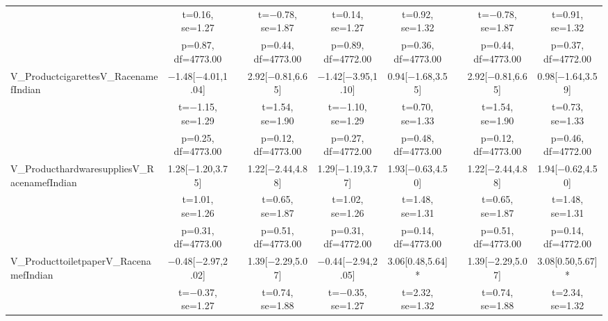 \documentclass[]{report}
\begin{document}
\begin{table}
{\begin{tabular}[t]{lcccccccc}
		& t=\num{0.16}, se=\num{1.27} &  & t=\num{-0.78}, se=\num{1.87} & t=\num{0.14}, se=\num{1.27} & t=\num{0.92}, se=\num{1.32} &  & t=\num{-0.78}, se=\num{1.87} & t=\num{0.91}, se=\num{1.32}\\
		& p=\num{0.87}, df=\num{4773.00} &  & p=\num{0.44}, df=\num{4773.00} & p=\num{0.89}, df=\num{4772.00} & p=\num{0.36}, df=\num{4773.00} &  & p=\num{0.44}, df=\num{4773.00} & p=\num{0.37}, df=\num{4772.00}\\
		V\_ProductcigarettesV\_RacenamefIndian & \num{-1.48}[\num{-4.01},\num{1.04}] &  & \num{2.92}[\num{-0.81},\num{6.65}] & \num{-1.42}[\num{-3.95},\num{1.10}] & \num{0.94}[\num{-1.68},\num{3.55}] &  & \num{2.92}[\num{-0.81},\num{6.65}] & \num{0.98}[\num{-1.64},\num{3.59}]\\
		& t=\num{-1.15}, se=\num{1.29} &  & t=\num{1.54}, se=\num{1.90} & t=\num{-1.10}, se=\num{1.29} & t=\num{0.70}, se=\num{1.33} &  & t=\num{1.54}, se=\num{1.90} & t=\num{0.73}, se=\num{1.33}\\
		& p=\num{0.25}, df=\num{4773.00} &  & p=\num{0.12}, df=\num{4773.00} & p=\num{0.27}, df=\num{4772.00} & p=\num{0.48}, df=\num{4773.00} &  & p=\num{0.12}, df=\num{4773.00} & p=\num{0.46}, df=\num{4772.00}\\
		V\_ProducthardwaresuppliesV\_RacenamefIndian & \num{1.28}[\num{-1.20},\num{3.75}] &  & \num{1.22}[\num{-2.44},\num{4.88}] & \num{1.29}[\num{-1.19},\num{3.77}] & \num{1.93}[\num{-0.63},\num{4.50}] &  & \num{1.22}[\num{-2.44},\num{4.88}] & \num{1.94}[\num{-0.62},\num{4.50}]\\
		& t=\num{1.01}, se=\num{1.26} &  & t=\num{0.65}, se=\num{1.87} & t=\num{1.02}, se=\num{1.26} & t=\num{1.48}, se=\num{1.31} &  & t=\num{0.65}, se=\num{1.87} & t=\num{1.48}, se=\num{1.31}\\
		& p=\num{0.31}, df=\num{4773.00} &  & p=\num{0.51}, df=\num{4773.00} & p=\num{0.31}, df=\num{4772.00} & p=\num{0.14}, df=\num{4773.00} &  & p=\num{0.51}, df=\num{4773.00} & p=\num{0.14}, df=\num{4772.00}\\
		V\_ProducttoiletpaperV\_RacenamefIndian & \num{-0.48}[\num{-2.97},\num{2.02}] &  & \num{1.39}[\num{-2.29},\num{5.07}] & \num{-0.44}[\num{-2.94},\num{2.05}] & \num{3.06}[\num{0.48},\num{5.64}]* &  & \num{1.39}[\num{-2.29},\num{5.07}] & \num{3.08}[\num{0.50},\num{5.67}]*\\
		& t=\num{-0.37}, se=\num{1.27} &  & t=\num{0.74}, se=\num{1.88} & t=\num{-0.35}, se=\num{1.27} & t=\num{2.32}, se=\num{1.32} &  & t=\num{0.74}, se=\num{1.88} & t=\num{2.34}, se=\num{1.32}\\

\end{tabular}}
\end{table}
\end{document}
